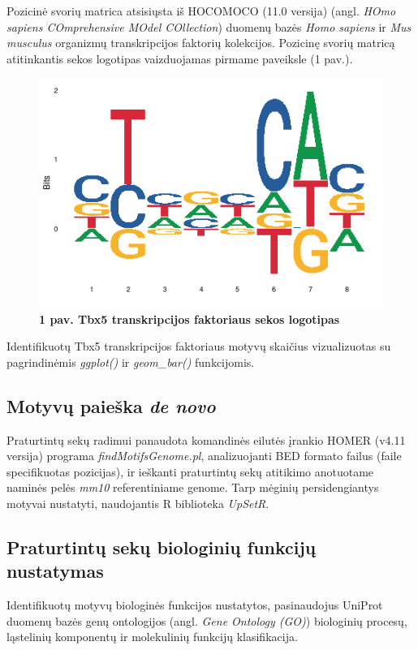 \documentclass[12pt]{article}
\begin{document}
Pozicinė svorių matrica atsisiųsta iš HOCOMOCO\cite{HOCOMOCO} (11.0 versija)
(angl. \emph{HOmo sapiens COmprehensive MOdel COllection}) duomenų bazės
\emph{Homo sapiens} ir \emph{Mus musculus} organizmų transkripcijos faktorių
kolekcijos. Pozicinę svorių matricą atitinkantis sekos logotipas vaizduojamas
pirmame paveiksle (1 pav.).

\begin{figure}[htb]
    \begin{center}
        \includegraphics[width=0.5\linewidth]{../Figures/tbx5_motif.png}
        \caption*{\small\textbf{1 pav. Tbx5 transkripcijos faktoriaus
                                sekos logotipas}}
    \end{center}
\end{figure}

Identifikuotų Tbx5 transkripcijos faktoriaus motyvų skaičius vizualizuotas su
pagrindinėmis \emph{ggplot()} ir \emph{geom\_bar()} funkcijomis.

\subsection{Motyvų paieška \emph{de novo}}
Praturtintų sekų radimui panaudota komandinės eilutės įrankio HOMER\cite{HOMER}
(v4.11 versija) programa \emph{findMotifsGenome.pl}, analizuojanti BED formato
failus (faile specifikuotas pozicijas), ir ieškanti praturtintų sekų atitikimo
anotuotame naminės pelės \emph{mm10} referentiniame genome. Tarp mėginių
persidengiantys motyvai nustatyti, naudojantis R biblioteka
\emph{UpSetR}\cite{UPSETR}.

\subsection{Praturtintų sekų biologinių funkcijų nustatymas}
Identifikuotų motyvų biologinės funkcijos nustatytos, pasinaudojus
UniProt\cite{UNIPROT} duomenų bazės genų ontologijos (angl. \emph{Gene
Ontology (GO)}) biologinių procesų, ląstelinių komponentų ir molekulinių
funkcijų klasifikacija.
\end{document}
